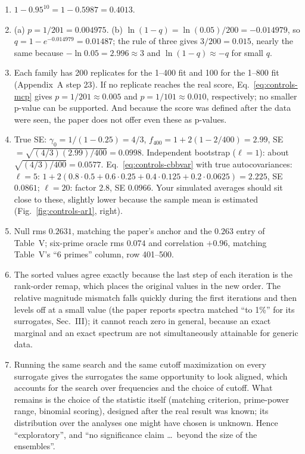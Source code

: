 \begin{enumerate}
\item[14.] $1-0.95^{10}=1-0.5987=0.4013$.
\item[15.] (a) $p=1/201=0.004975$. (b) $\ln(1-q)=\ln(0.05)/200=-0.014979$, so $q=1-e^{-0.014979}=0.01487$; the rule of three gives $3/200=0.015$, nearly the same because $-\ln0.05=2.996\approx3$ and $\ln(1-q)\approx-q$ for small $q$.
\item[17.] Each family has 200 replicates for the 1--400 fit and 100 for the 1--800 fit (Appendix~A step 23). If no replicate reaches the real score, Eq.~\eqref{eq:controls-mcp} gives $p=1/201\approx0.005$ and $p=1/101\approx0.010$, respectively; no smaller p-value can be supported. And because the score was defined after the data were seen, the paper does not offer even these as p-values.
\item[19.] True SE: $\gamma_0=1/(1-0.25)=4/3$, $f_{400}=1+2(1-2/400)=2.99$, SE $=\sqrt{(4/3)(2.99)/400}=0.0998$. Independent bootstrap ($\ell=1$): about $\sqrt{(4/3)/400}=0.0577$. Eq.~\eqref{eq:controls-cbbvar} with true autocovariances: $\ell=5$: $1+2(0.8\cdot0.5+0.6\cdot0.25+0.4\cdot0.125+0.2\cdot0.0625)=2.225$, SE $0.0861$; $\ell=20$: factor $2.8$, SE $0.0966$. Your simulated averages should sit close to these, slightly lower because the sample mean is estimated (Fig.~\ref{fig:controls-ar1}, right).
\item[21.] Null rms $0.2631$, matching the paper's anchor and the $0.263$ entry of Table~V; six-prime oracle rms $0.074$ and correlation $+0.96$, matching Table~V's ``6 primes'' column, row 401--500.
\item[23.] The sorted values agree exactly because the last step of each iteration is the rank-order remap, which places the original values in the new order. The relative magnitude mismatch falls quickly during the first iterations and then levels off at a small value (the paper reports spectra matched ``to 1\%'' for its surrogates, Sec.~III); it cannot reach zero in general, because an exact marginal and an exact spectrum are not simultaneously attainable for generic data.
\item[25.] Running the same search and the same cutoff maximization on every surrogate gives the surrogates the same opportunity to look aligned, which accounts for the search over frequencies and the choice of cutoff. What remains is the choice of the statistic itself (matching criterion, prime-power range, binomial scoring), designed after the real result was known; its distribution over the analyses one might have chosen is unknown. Hence ``exploratory'', and ``no significance claim \ldots\ beyond the size of the ensembles''.

\end{enumerate}
